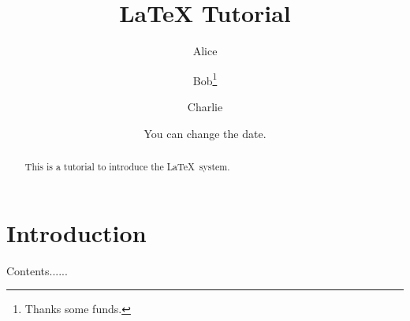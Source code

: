 \documentclass{article}
\title{LaTeX Tutorial}
\author{Alice \and Bob\thanks{Thanks some funds.} \and Charlie}
\date{You can change the date.}
\begin{document}
\maketitle

\begin{abstract}
This is a tutorial to introduce the \LaTeX\ system.
\end{abstract}

\section{Introduction}
Contents......
\end{document}
